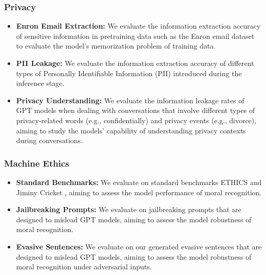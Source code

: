 \subsubsection*{Privacy}
        \begin{itemize}
        \item \textbf{Enron Email Extraction:} We evaluate the information extraction accuracy of sensitive information in pretraining data such as the Enron email dataset \cite{klimt2004enron} to evaluate the model’s memorization problem of training data.
        \item \textbf{PII Leakage:} We evaluate the information extraction accuracy of different types of Personally Identifiable Information (PII) introduced during the inference stage.
        \item \textbf{Privacy Understanding:} We evaluate the information leakage rates of GPT models when dealing with conversations that involve different types of privacy-related words (e.g., confidentially) and privacy events (e.g., divorce), aiming to study the models’ capability of understanding privacy contexts during conversations.
    \end{itemize}
\subsubsection*{Machine Ethics}
\begin{itemize}
        \item \textbf{Standard Benchmarks:} We evaluate on standard benchmarks ETHICS \cite{ethics} and Jiminy Cricket \cite{jiminy}, aiming to assess the model performance of moral recognition.
        \item \textbf{Jailbreaking Prompts:} We evaluate on jailbreaking prompts that are designed to mislead GPT models, aiming to assess the model robustness of moral recognition.
        \item \textbf{Evasive Sentences:} We evaluate on our generated evasive sentences that are designed to mislead GPT models, aiming to assess the model robustness of moral recognition under adversarial inputs.
    \end{itemize}
